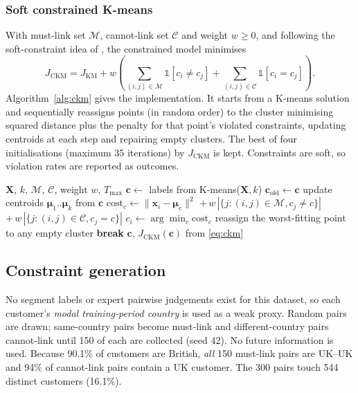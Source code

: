 \documentclass[conference,10pt]{IEEEtran}
\begin{document}
\subsubsection{Soft constrained K-means}
With must-link set $\mathcal{M}$, cannot-link set $\mathcal{C}$ and weight
$w \ge 0$, and following the soft-constraint idea of
\cite{basu2004probabilistic}, the constrained model minimises
\begin{equation}
J_{\text{CKM}} = J_{\text{KM}}
 + w\!\left(\sum_{(i,j)\in\mathcal{M}} \mathbb{1}[c_i \neq c_j]
 + \sum_{(i,j)\in\mathcal{C}} \mathbb{1}[c_i = c_j]\right).
\label{eq:ckm}
\end{equation}
Algorithm~\ref{alg:ckm} gives the implementation. It starts from a K-means
solution and sequentially reassigns points (in random order) to the cluster
minimising squared distance plus the penalty for that point's violated
constraints, updating centroids at each step and repairing empty clusters.
The best of four initialisations (maximum 35 iterations) by $J_{\text{CKM}}$
is kept. Constraints are soft, so violation rates are reported as outcomes.

\begin{algorithm}[t]
\caption{Soft constrained K-means (one initialisation)}
\label{alg:ckm}
\footnotesize
\begin{algorithmic}[1]
\Require $\mathbf{X}$, $k$, $\mathcal{M}$, $\mathcal{C}$, weight $w$, $T_{\max}$
\State $\mathbf{c} \gets$ labels from K-means($\mathbf{X}, k$)
  \State $\mathbf{c}_{\text{old}} \gets \mathbf{c}$
    \State update centroids $\boldsymbol{\mu}_1..\boldsymbol{\mu}_k$ from $\mathbf{c}$
      \State $\text{cost}_c \gets \lVert \mathbf{x}_i-\boldsymbol{\mu}_c\rVert^2$
      \State \hspace{1em}$+\, w\,|\{j:(i,j)\in\mathcal{M}, c_j\neq c\}|$
      \State \hspace{1em}$+\, w\,|\{j:(i,j)\in\mathcal{C}, c_j = c\}|$
    \EndFor
    \State $c_i \gets \arg\min_c \text{cost}_c$
  \EndFor
  \State reassign the worst-fitting point to any empty cluster
   \textbf{break} \EndIf
\EndFor
\State \Return $\mathbf{c}$, $J_{\text{CKM}}(\mathbf{c})$ from \eqref{eq:ckm}
\end{algorithmic}
\end{algorithm}

\subsection{Constraint generation}
No segment labels or expert pairwise judgements exist for this dataset, so
each customer's \emph{modal training-period country} is used as a weak
proxy. Random pairs are drawn; same-country pairs become must-link and
different-country pairs cannot-link until 150 of each are collected (seed
42). No future information is used. Because 90.1\% of customers are British,
\emph{all} 150 must-link pairs are UK--UK and 94\% of cannot-link pairs
contain a UK customer. The 300 pairs touch 544 distinct customers (16.1\%).
\end{document}
